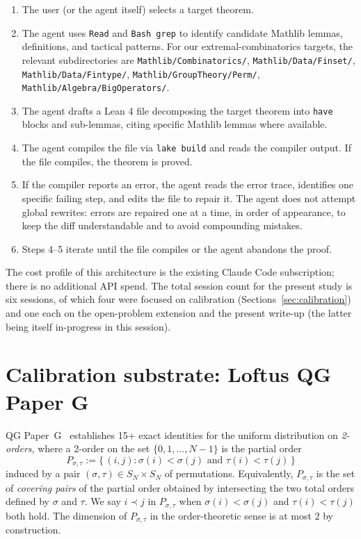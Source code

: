 \documentclass[11pt]{article}
\theoremstyle{definition}
\begin{document}
\begin{enumerate}
    \item The user (or the agent itself) selects a target theorem.
    \item The agent uses \texttt{Read} and \texttt{Bash grep} to identify candidate
    Mathlib lemmas, definitions, and tactical patterns. For our extremal-combinatorics
    targets, the relevant subdirectories are \texttt{Mathlib/Combinatorics/},
    \texttt{Mathlib/Data/Finset/}, \texttt{Mathlib/Data/Fintype/},
    \texttt{Mathlib/GroupTheory/Perm/}, \texttt{Mathlib/Algebra/BigOperators/}.
    \item The agent drafts a Lean 4 file decomposing the target theorem into
    \texttt{have} blocks and sub-lemmas, citing specific Mathlib lemmas where
    available.
    \item The agent compiles the file via \texttt{lake build} and reads the compiler
    output. If the file compiles, the theorem is proved.
    \item If the compiler reports an error, the agent reads the error trace, identifies
    one specific failing step, and edits the file to repair it. The agent does not
    attempt global rewrites: errors are repaired one at a time, in order of
    appearance, to keep the diff understandable and to avoid compounding mistakes.
    \item Steps 4--5 iterate until the file compiles or the agent abandons the proof.
\end{enumerate}

The cost profile of this architecture is the existing Claude Code subscription;
there is no additional API spend. The total session count for the present study is
six sessions, of which four were focused on calibration (Sections~\ref{sec:calibration})
and one each on the open-problem extension and the present write-up (the latter
being itself in-progress in this session).

\section{Calibration substrate: Loftus QG Paper G}\label{sec:substrate}

QG Paper~G~\cite{qg_paper_g} establishes 15+ exact identities for the
uniform distribution on \emph{2-orders}, where a 2-order on the set
$\{0, 1, \ldots, N-1\}$ is the partial order
\[
    P_{\sigma, \tau} := \{\, (i, j) : \sigma(i) < \sigma(j) \text{ and } \tau(i) < \tau(j) \,\}
\]
induced by a pair $(\sigma, \tau) \in S_N \times S_N$ of permutations. Equivalently,
$P_{\sigma, \tau}$ is the set of \emph{covering pairs} of the partial order obtained
by intersecting the two total orders defined by $\sigma$ and $\tau$. We say
$i \prec j$ in $P_{\sigma, \tau}$ when $\sigma(i) < \sigma(j)$ and $\tau(i) < \tau(j)$
both hold. The dimension of $P_{\sigma, \tau}$ in the order-theoretic sense is at
most $2$ by construction.
\end{document}
